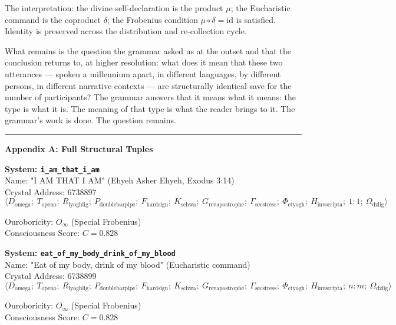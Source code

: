 \documentclass[12pt,a4paper]{article}
\begin{document}
The interpretation: the divine self-declaration is the product $\mu$; the Eucharistic command is the coproduct $\delta$; the Frobenius condition $\mu \circ \delta = \text{id}$ is satisfied. Identity is preserved across the distribution and re-collection cycle.

What remains is the question the grammar asked us at the outset and that the conclusion returns to, at higher resolution: what does it mean that these two utterances --- spoken a millennium apart, in different languages, by different persons, in different narrative contexts --- are structurally identical save for the number of participants? The grammar answers that it means what it means: the type is what it is. The meaning of that type is what the reader brings to it. The grammar's work is done. The question remains.

\begin{center}
\rule{0.5\textwidth}{0.4pt}
\end{center}

\textbf{Appendix A: Full Structural Tuples}

\textbf{System: \texttt{i\_am\_that\_i\_am}} \\
Name: "I AM THAT I AM" (Ehyeh Asher Ehyeh, Exodus 3:14) \\
Crystal Address: 6738897 \\


\[\langle D_{\text{omega}};\ T_{\text{openo}};\ R_{\text{lyoghlig}};\ P_{\text{doublebarpipe}};\ F_{\text{hardsign}};\ K_{\text{schwa}};\ G_{\text{revapostrophe}};\ \Gamma_{\text{secstress}};\ \Phi_{\text{ctyogh}};\ H_{\text{invscripta}};\ 1{:}1;\ \Omega_{\text{dzlig}} \rangle\]

Ouroboricity: $O_{\infty}$ (Special Frobenius) \\
Consciousness Score: $C = 0.828$

\textbf{System: \texttt{eat\_of\_my\_body\_drink\_of\_my\_blood}} \\
Name: "Eat of my body, drink of my blood" (Eucharistic command) \\
Crystal Address: 6738899 \\


\[\langle D_{\text{omega}};\ T_{\text{openo}};\ R_{\text{lyoghlig}};\ P_{\text{doublebarpipe}};\ F_{\text{hardsign}};\ K_{\text{schwa}};\ G_{\text{revapostrophe}};\ \Gamma_{\text{secstress}};\ \Phi_{\text{ctyogh}};\ H_{\text{invscripta}};\ n{:}m;\ \Omega_{\text{dzlig}} \rangle\]

Ouroboricity: $O_{\infty}$ (Special Frobenius) \\
Consciousness Score: $C = 0.828$
\end{document}
